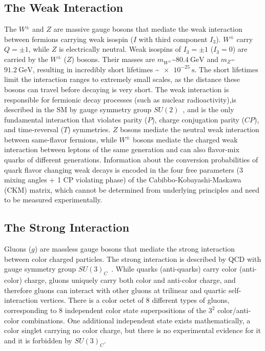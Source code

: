 \subsection{The Weak Interaction}
The $W^\pm$ and $Z$ are massive gauge bosons that mediate the weak interaction between fermions carrying weak isospin ($I$ with third component $I_3$).
$W^\pm$ carry $Q = \pm 1$, while $Z$ is electrically neutral.
Weak isospins of $I_3 = \pm 1$ ($I_3 = 0$) are carried by the $W^\pm$ ($Z$) bosons.
Their masses are $m_{W^\pm}$\sim$\SI{80.4}{\GeV}$ and $m_Z$\sim$\SI{91.2}{\GeV}$, resulting in incredibly short lifetimes \sim$\SI{e-25}{\s}$.
The short lifetimes limit the interaction ranges to extremely small scales, as the distance these bosons can travel before decaying is very short.
The weak interaction is responsible for fermionic decay processes (such as nuclear radioactivity),is described in the SM by gauge symmetry group $SU(2)$~\cite{nagashima_2013_V1}, and is the only fundamental interaction that violates parity ($P$), charge conjugation parity ($CP$), and time-reversal ($T$) symmetries.
$Z$ bosons mediate the neutral weak interaction between same-flavor fermions, while $W^\pm$ bosons mediate the charged weak interaction between leptons of the same generation and can also flavor-mix quarks of different generations.
Information about the conversion probabilities of quark flavor changing weak decays is encoded in the four free parameters (3 mixing angles + 1 CP violating phase) of the Cabibbo-Kobayashi-Maskawa (CKM) matrix, which cannot be determined from underlying principles and need to be measured experimentally.

\subsection{The Strong Interaction}
Gluons ($g$) are massless gauge bosons that mediate the strong interaction between color charged particles.
The strong interaction is described by QCD with gauge symmetry group $SU(3)_C$~\cite{nagashima_2013_V1}.
While quarks (anti-quarks) carry color (anti-color) charge, gluons uniquely carry both color and anti-color charge, and therefore gluons can interact with other gluons at trilinear and quartic self-interaction vertices.
There is a color octet of 8 different types of gluons, corresponding to 8 independent color state superpositions of the $3^2$ color/anti-color combinations.
One additional independent state exists mathematically, a color singlet carrying no color charge, but there is no experimental evidence for it and it is forbidden by $SU(3)_C$.

